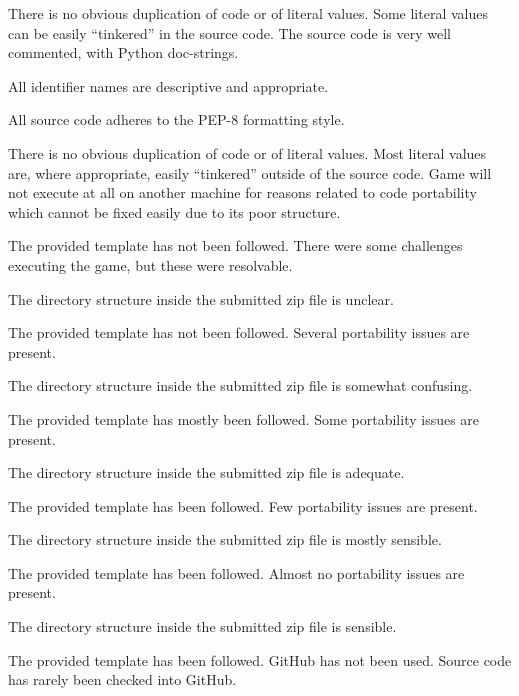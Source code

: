 \documentclass{../fal_assignment}
\begin{document}
\begin{markingrubric}
             \par There is no obvious duplication of code or of literal values. Some literal values can be easily ``tinkered'' in the source code. 
        \grade The source code is very well commented, with Python doc-strings.
            \par All identifier names are descriptive and appropriate.
            \par All source code adheres to the PEP-8 formatting style.
             \par There is no obvious duplication of code or of literal values. Most literal values are, where appropriate, easily ``tinkered'' outside of the source code.  
%
        \grade\fail Game will not execute at all on another machine for reasons related to code portability which cannot be fixed easily due to its poor structure.
            \par The provided template has not been followed.
        \grade There were some challenges executing the game, but these were resolvable.
            \par The directory structure inside the submitted zip file is unclear.
            \par The provided template has not been followed.
        \grade Several portability issues are present.
            \par The directory structure inside the submitted zip file is somewhat confusing.
            \par The provided template has mostly been followed.
        \grade Some portability issues are present.
            \par The directory structure inside the submitted zip file is adequate.
            \par The provided template has been followed.
        \grade Few portability issues are present.
            \par The directory structure inside the submitted zip file is mostly sensible.
            \par The provided template has been followed.
        \grade Almost no portability issues are present.
            \par The directory structure inside the submitted zip file is sensible.
            \par The provided template has been followed.
%
        \grade\fail GitHub has not been used.
        \grade Source code has rarely been checked into GitHub.

\end{markingrubric}
\end{document}

